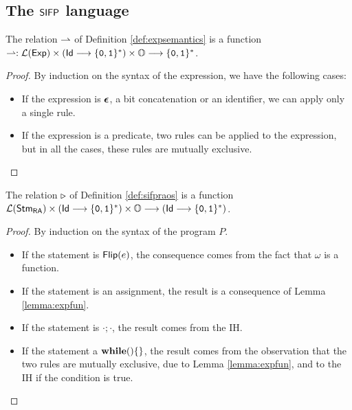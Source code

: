 \subsection{The $\mathsf{SIFP}$ language}
\label{sub:techsifplan}


\begin{lemma}
  \label{lemma:expfun}
  The relation $\rightharpoonup$ of Definition \ref{def:expsemantics} is a function
  $\rightharpoonup: {\mathcal L ({\mathsf{Exp}})} \times (\mathsf{Id} \longrightarrow \{\mathtt{0}, \mathtt{1}\}^*)\times \mathbb{O} \longrightarrow \{\mathtt{0}, \mathtt{1}\}^*$.
\end{lemma}
\begin{proof}
  By induction on the syntax of the expression, we have the following cases:
  \begin{itemize}
    \item If the expression is $\bm{\epsilon}$, a bit concatenation or an identifier, we can apply only a single rule.
    \item If the expression is a predicate, two rules can be applied to the expression, but in all the cases, these rules are mutually exclusive.
  \end{itemize}
\end{proof}


\begin{lemma}
  \label{lemma:sifprasemfun}
  The relation $\triangleright$ of Definition \ref{def:sifpraos} is a function
  ${\mathcal L ({\mathsf{Stm}_{\mathsf{RA}}})} \times (\mathsf{Id} \longrightarrow \{\mathtt{0}, \mathtt{1}\}^*)\times \mathbb{O}\longrightarrow (\mathsf{Id} \longrightarrow \{\mathtt{0}, \mathtt{1}\}^*)$.
\end{lemma}
\begin{proof}
  By induction on the syntax of the program $P$.
  \begin{itemize}
    \item If the statement is $\mathsf{Flip(}e\mathsf{)}$, the consequence comes from the fact that $\omega$ is a function.
    \item If the statement is an assignment, the result is a consequence of Lemma \ref{lemma:expfun}.
    \item If the statement is $\cdot;\cdot$, the result comes from the IH.
    \item If the statement a $\mathbf{while}()\{\}$, the result comes from the observation that the two rules are mutually exclusive, due to Lemma \ref{lemma:expfun}, and to the IH if the condition is true.
  \end{itemize}
\end{proof}

